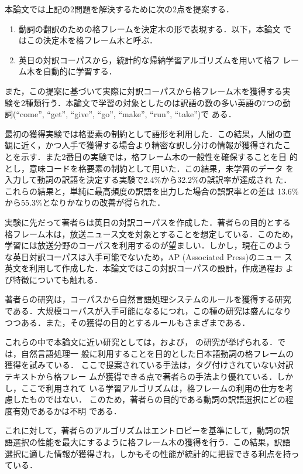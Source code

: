 本論文では上記の2問題を解決するために次の2点を提案する．
\begin{enumerate}
\item 動詞の翻訳のための格フレームを決定木の形で表現する．以下，本論文
  ではこの決定木を格フレーム木と呼ぶ．
\item 英日の対訳コーパスから，統計的な帰納学習アルゴリズムを用いて格フ
  レーム木を自動的に学習する\cite{TanAndEha93,Tan94a,Tan94b}．
\end{enumerate}
また，この提案に基づいて実際に対訳コーパスから格フレーム木を獲得する実
験を2種類行う．本論文で学習の対象としたのは訳語の数の多い英語の7つの動
詞(``come'', ``get'', ``give'', ``go'', ``make'', ``run'', ``take'')で
ある．

最初の獲得実験では格要素の制約として語形を利用した．この結果，人間の直
観に近く，かつ人手で獲得する場合より精密な訳し分けの情報が獲得されたこ
とを示す．また2番目の実験では，格フレーム木の一般性を確保することを目
的とし，意味コードを格要素の制約として用いた．この結果，未学習のデータ
を入力して動詞の訳語を決定する実験で2.4\%から32.2\%の誤訳率が達成され
た．これらの結果と，単純に最高頻度の訳語を出力した場合の誤訳率との差は
13.6\%から55.3\%となりかなりの改善が得られた．

実験に先だって著者らは英日の対訳コーパスを作成した．著者らの目的とする
格フレーム木は，放送ニュース文を対象とすることを想定している．このため，
学習には放送分野のコーパスを利用するのが望ましい．しかし，現在このよう
な英日対訳コーパスは入手可能でないため，AP (Associated Press)のニュー
ス英文を利用して作成した．本論文ではこの対訳コーパスの設計，作成過程お
よび特徴についても触れる．

著者らの研究は，コーパスから自然言語処理システムのルールを獲得する研究
である．大規模コーパスが入手可能になるにつれ，この種の研究は盛んになり
つつある．また，その獲得の目的とするルールもさまざまである．

これらの中で本論文に近い研究としては，\cite{UtuAndMat93}および，
\cite{Alm94}の研究が挙げられる．\cite{UtuAndMat93}では，自然言語処理一
般に利用することを目的とした日本語動詞の格フレームの獲得を試みている．
ここで提案されている手法は，タグ付けされていない対訳テキストから格フレー
ムが獲得できる点で著者らの手法より優れている．しかし，ここで利用されて
いる学習アルゴリズムは，格フレームの利用の仕方を考慮したものではない．
このため，著者らの目的である動詞の訳語選択にどの程度有効であるかは不明
である．

これに対して，著者らのアルゴリズムはエントロピーを基準にして，動詞の訳
語選択の性能を最大にするように格フレーム木の獲得を行う．この結果，訳語
選択に適した情報が獲得され，しかもその性能が統計的に把握できる利点を持っ
ている．

